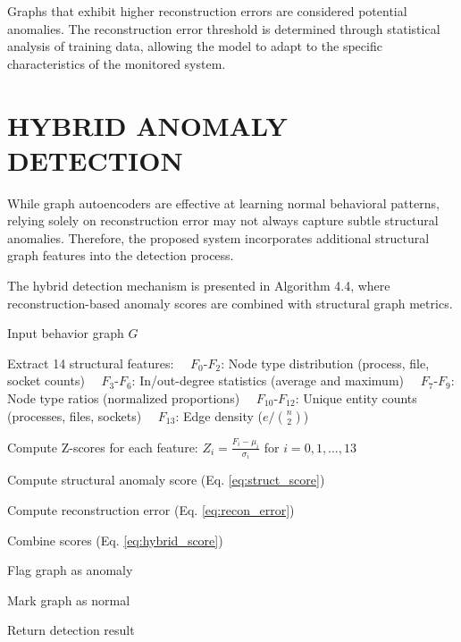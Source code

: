 Graphs that exhibit higher reconstruction errors are considered potential anomalies. The reconstruction error threshold is determined through statistical analysis of training data, allowing the model to adapt to the specific characteristics of the monitored system.


\section{\uppercase{HYBRID ANOMALY DETECTION}}

While graph autoencoders are effective at learning normal behavioral patterns, relying solely on reconstruction error may not always capture subtle structural anomalies. Therefore, the proposed system incorporates additional structural graph features into the detection process.

The hybrid detection mechanism is presented in Algorithm 4.4, where reconstruction-based anomaly scores are combined with structural graph metrics.

\begin{algorithm}[H]
\caption{Hybrid Anomaly Detection}
\begin{algorithmic}[1]

\State Input behavior graph $G$

\State Extract 14 structural features:
\State \ \ $F_0$-$F_2$: Node type distribution (process, file, socket counts)
\State \ \ $F_3$-$F_6$: In/out-degree statistics (average and maximum)
\State \ \ $F_7$-$F_9$: Node type ratios (normalized proportions)
\State \ \ $F_{10}$-$F_{12}$: Unique entity counts (processes, files, sockets)
\State \ \ $F_{13}$: Edge density ($e/\binom{n}{2}$)

\State Compute Z-scores for each feature:
\State $Z_i = \frac{F_i - \mu_i}{\sigma_i}$ for $i = 0, 1, \ldots, 13$

\State Compute structural anomaly score (Eq. \ref{eq:struct_score})

\State Compute reconstruction error (Eq. \ref{eq:recon_error})

\State Combine scores (Eq. \ref{eq:hybrid_score})


\State Flag graph as anomaly

\Else

\State Mark graph as normal

\EndIf

\State Return detection result

\end{algorithmic}
\end{algorithm}

